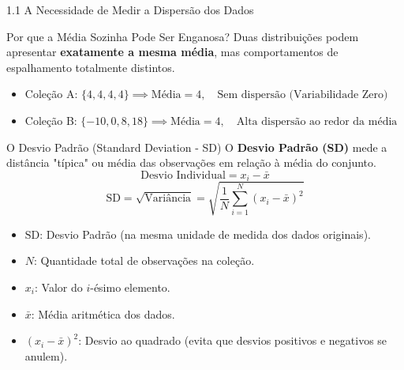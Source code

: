 \documentclass[10pt, aspectratio=169]{beamer}
\begin{document}
\begin{frame}{1.1 A Necessidade de Medir a Dispersão dos Dados}
    \vspace{-0.2cm}
    \begin{block}{Por que a Média Sozinha Pode Ser Enganosa?}
        Duas distribuições podem apresentar \textbf{exatamente a mesma média}, mas comportamentos de espalhamento totalmente distintos.
        \begin{itemize}
            \item Coleção A: $\{4, 4, 4, 4\} \implies \text{Média} = 4, \quad \text{Sem dispersão (Variabilidade Zero)}$
            \item Coleção B: $\{-10, 0, 8, 18\} \implies \text{Média} = 4, \quad \text{Alta dispersão ao redor da média}$
        \end{itemize}
    \end{block}
    \begin{exampleblock}{O Desvio Padrão (Standard Deviation - SD)}
        O \textbf{Desvio Padrão (SD)} mede a distância "típica" ou média das observações em relação à média do conjunto.
        \vspace{-0.4cm}
        \[ \text{Desvio Individual} = x_i - \bar{x} \]
        \[ \text{SD} = \sqrt{\text{Variância}} = \sqrt{\frac{1}{N} \sum_{i=1}^N (x_i - \bar{x})^2} \]
        \vspace{-0.4cm}
        {\footnotesize \begin{itemize}
            \item $\text{SD}$: Desvio Padrão (na mesma unidade de medida dos dados originais).
            \item $N$: Quantidade total de observações na coleção.
            \item $x_i$: Valor do $i$-ésimo elemento.
            \item $\bar{x}$: Média aritmética dos dados.
            \item $(x_i - \bar{x})^2$: Desvio ao quadrado (evita que desvios positivos e negativos se anulem).
        \end{itemize}}
    \end{exampleblock}
\end{frame}
\end{document}
